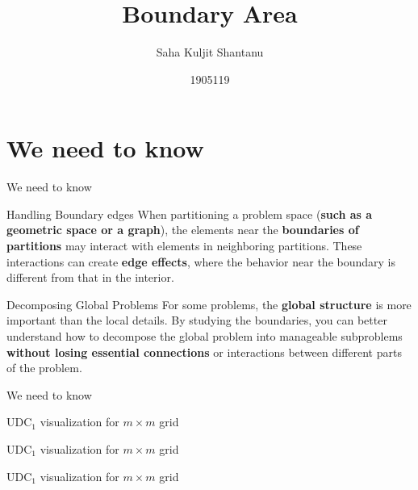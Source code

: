 \documentclass{beamer}
\title{Boundary Area}
\author{Saha Kuljit Shantanu}
\date{1905119}
\begin{document}
\maketitle

\section{We need to know}



\begin{frame}{We need to know}

\begin{block}{Handling Boundary edges}
   When partitioning a problem space (\textbf{such as a geometric space or a graph}), the elements near the \textbf{boundaries of partitions} may interact with elements in neighboring partitions. These interactions can create \textbf{edge effects}, where the behavior near the boundary is different from that in the interior.
\end{block}
    
\begin{block}{Decomposing Global Problems}
    For some problems, the \textbf{global structure} is more important than the local details. By studying the boundaries, you can better understand how to decompose the global problem into manageable subproblems \textbf{without losing essential connections} or interactions between different parts of the problem.
\end{block}

\end{frame}

\begin{frame}{We need to know}



\end{frame}

\begin{frame}{UDC$_1$ visualization for $m \times m$ grid}



\end{frame}

\begin{frame}{UDC$_1$ visualization for $m \times m$ grid}



\end{frame}

\begin{frame}{UDC$_1$ visualization for $m \times m$ grid}



\end{frame}
\end{document}
